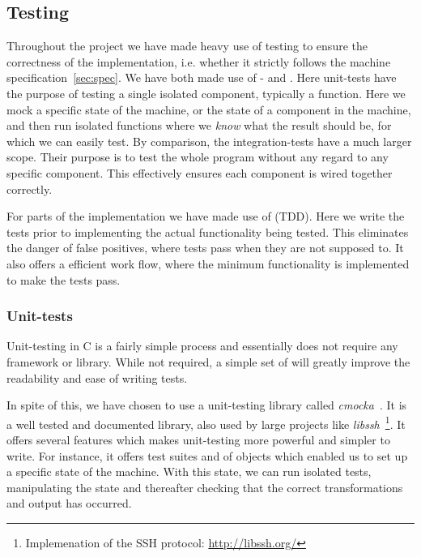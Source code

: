 \subsection{Testing}

Throughout the project we have made heavy use of testing to ensure the
correctness of the implementation, i.e. whether it strictly follows the machine
specification~\ref{sec:spec}. We have both made use of - and
. Here unit-tests have the purpose of testing a single
isolated component, typically a function. Here we mock a specific state of the
machine, or the state of a component in the machine, and then run isolated
functions where we {\it know} what the result should be, for which we can easily
test. By comparison, the integration-tests have a much larger scope. Their
purpose is to test the whole program without any regard to any specific
component. This effectively ensures each component is wired together correctly.

For parts of the implementation we have made use of  (TDD). Here we write the tests prior to implementing the actual
functionality being tested. This eliminates the danger of false positives, where
tests pass when they are not supposed to. It also offers a efficient work flow,
where the minimum functionality is implemented to make the tests pass.

\subsubsection{Unit-tests}
Unit-testing in C is a fairly simple process and essentially does not require
any framework or library. While not required, a simple set of  will
greatly improve the readability and ease of writing tests.

In spite of this, we have chosen to use a unit-testing library called {\it
  cmocka}~\cite{cmocka}. It is a well tested and documented library, also used
by large projects like {\it libssh}~\footnote{Implemenation of the SSH protocol:
  \url{http://libssh.org/}}. It offers several features which makes unit-testing
more powerful and simpler to write. For instance, it offers test suites and
 of objects which enabled us to set up a specific state of the
machine. With this state, we can run isolated tests, manipulating the state and
thereafter checking that the correct transformations and output has occurred.

